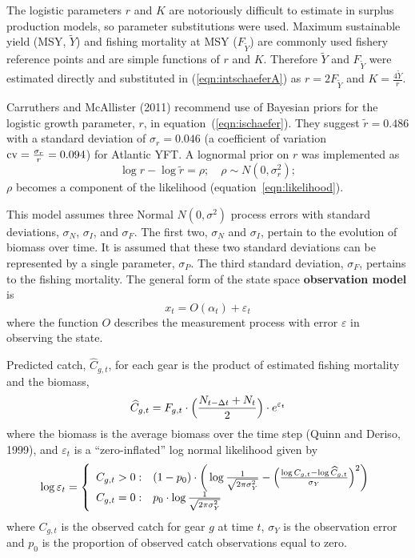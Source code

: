\documentclass[12pt,letterpaper]{article}
\newcommand\MSY{\widetilde{Y}}
\newcommand\Fmsy{F_{\MSY}}
\begin{document}
The logistic parameters $r$ and $K$ are notoriously difficult to estimate
in surplus production models, 
so parameter substitutions were used. 
Maximum sustainable yield
(MSY, $\MSY$) and fishing mortality at MSY ($\Fmsy$) are commonly used
fishery reference points and are simple functions of $r$ and $K$.
Therefore $\MSY$ and $\Fmsy$ were
estimated directly and substituted in (\ref{eqn:intschaeferA}) as
$r=2\Fmsy$ and $K=\frac{4\MSY}{r}$.

Carruthers and McAllister (2011) recommend use of Bayesian priors for the
logistic growth parameter, $r$, in equation~(\ref{eqn:ischaefer}). They
suggest $\tilde{r} = 0.486$ with a standard deviation of $\sigma_r = 0.046$
(a coefficient of variation ${\rm cv}=\frac{\sigma_r}{r}=0.094$)
for Atlantic YFT.
A lognormal prior on $r$ was implemented as 
\begin{equation}
\log r - \log \tilde{r} = \rho ;\quad \rho\sim N(0,\sigma^2_r);
\end{equation}
$\rho$ becomes a component of the likelihood
(equation~\ref{eqn:likelihood}).

This model assumes three Normal $N(0,\sigma^2)$ process errors with
standard deviations, $\sigma_N$, $\sigma_I$, and $\sigma_F$. The first
two, $\sigma_N$ and $\sigma_I$, pertain to the evolution of biomass over
time. It is assumed that these two standard deviations can be
represented by a single parameter, $\sigma_P$. The third standard
deviation, $\sigma_F$, pertains to the fishing mortality.
\pagebreak[2]
The general form of the state space {\bf observation model} is
\begin{equation}
x_t = O(\alpha_t) + \varepsilon_t
\end{equation}
where the function $O$ describes the measurement process with
error $\varepsilon$ in observing the state.

Predicted catch, $\widehat{C}_{g,t}$, for each gear is the product of
estimated fishing mortality and the biomass,
\begin{equation}
\widehat{C}_{g,t} = F_{g,t}\cdot\Bigl(\frac{N_{t-\Delta
t}+N_t}{2}\Bigr) \cdot e^{\varepsilon_t}
\label{eqn:obs1}
\end{equation}
where the biomass is  the average
biomass over the time step (Quinn and Deriso, 1999), and
$\varepsilon_t$ is a ``zero-inflated'' log normal likelihood given by
\begin{equation}
  \log \varepsilon_t = \left\{
    \begin{array}{r@{\;:\quad}l}
       C_{g,t} > 0 &
(1-p_0)\cdot\bigg(\log\frac{1}{\sqrt{2\pi\sigma^2_Y}}
          -\Bigl(\frac{\log
C_{g,t}-\log\widehat{C}_{g,t}}{\sigma_Y}\Bigr)^2\bigg)\\
       C_{g,t} = 0 & p_0 \cdot\log \frac{1}{\sqrt{2\pi\sigma^2_Y}}\\
    \end{array}
  \right.
\end{equation}
where $C_{g,t}$ is the observed catch for gear $g$ at time $t$,
$\sigma_Y$ is the observation error and
$p_0$ is the proportion of observed catch observations equal to zero.
\end{document}

